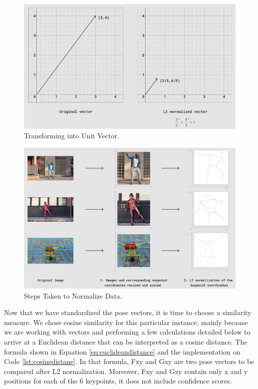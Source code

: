 

\begin{figure}[ht]
  \centering
  \includegraphics[scale=0.9]{gambar/transform-to-unit-vector.png}
  \caption{Transforming into Unit Vector.}
  \label{fig:transforming-into-unit-vector}
\end{figure}



\begin{figure}[ht]
  \centering
  \includegraphics[scale=0.9]{gambar/two-steps.png}
  \caption{Steps Taken to Normalize Data.}
  \label{fig:steps-to-normalize}
\end{figure}

Now that we have standardized the pose vectors, it is time to choose a similarity measure. We chose cosine similarity for this particular instance, mainly because we are working with vectors and performing a few calculations detailed below to arrive at a Euclidean distance that can be interpreted as a cosine distance.
The formula shown in Equation \ref{eq:euclideandistance} and the implementation on Code \ref{lst:cosinedistane}.
In that formula, Fxy and Gxy are two pose vectors to be compared after L2 normalization. Moreover, Fxy and Gxy contain only x and y positions for each of the 6 keypoints, it does not include confidence scores.


